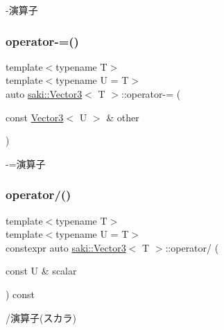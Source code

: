 -\/演算子 

\mbox{\label{classsaki_1_1_vector3_a3c15f413dc1c0aaef7311bd6dbb7224d}} 
\subsubsection{\texorpdfstring{operator-\/=()}{operator-=()}}
{\footnotesize\ttfamily template$<$typename T$>$ \\
template$<$typename U  = T$>$ \\
auto \mbox{\hyperlink{classsaki_1_1_vector3}{saki\+::\+Vector3}}$<$ T $>$\+::operator-\/= (\begin{DoxyParamCaption}\item[{const \mbox{\hyperlink{classsaki_1_1_vector3}{Vector3}}$<$ U $>$ \&}]{other }\end{DoxyParamCaption})\hspace{0.3cm}{\ttfamily [inline]}}



-\/=演算子 

\mbox{\label{classsaki_1_1_vector3_a0d015d863a635445b8f6456dfa2d94ec}} 
\subsubsection{\texorpdfstring{operator/()}{operator/()}\hspace{0.1cm}{\footnotesize\ttfamily [1/2]}}
{\footnotesize\ttfamily template$<$typename T$>$ \\
template$<$typename U  = T$>$ \\
constexpr auto \mbox{\hyperlink{classsaki_1_1_vector3}{saki\+::\+Vector3}}$<$ T $>$\+::operator/ (\begin{DoxyParamCaption}\item[{const U \&}]{scalar }\end{DoxyParamCaption}) const\hspace{0.3cm}{\ttfamily [inline]}}



/演算子(スカラ) 

\mbox{\label{classsaki_1_1_vector3_a902c894c260b73d50173a4e78b90e24a}} 
